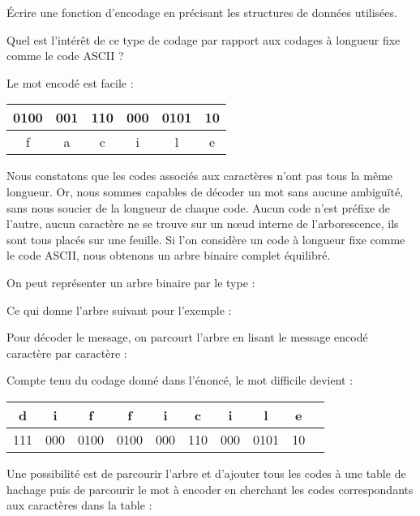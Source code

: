 Écrire une fonction d'encodage en précisant les structures de données utilisées.

\Q
Quel est l'intérêt de ce type de codage par rapport aux codages à longueur fixe comme le code ASCII ?
\newpage

\Corrige

\Q
Le mot encodé est \og facile \fg{} : \begin{tabular}{| c | c | c | c | c | c |}
    \hline
    0100 & 001 & 110 & 000 & 0101 & 10\\
    \hline
    f & a & c & i & l & e\\
    \hline
\end{tabular}
\medskip

Nous constatons que les codes associés aux caractères n'ont pas tous la même longueur. Or, nous sommes capables de décoder un mot sans aucune ambiguïté, sans nous soucier de la longueur de chaque code. Aucun code n'est préfixe de l'autre, aucun caractère ne se trouve sur un nœud interne de l'arborescence, ils sont tous placés sur une feuille. Si l'on considère un code à longueur fixe comme le code ASCII, nous obtenons un arbre binaire complet équilibré.

\Q
On peut représenter un arbre binaire par le type :



Ce qui donne l'arbre suivant pour l'exemple :



Pour décoder le message, on parcourt l'arbre en lisant le message encodé caractère par caractère :



\Q
Compte tenu du codage donné dans l'énoncé, le mot \og difficile \fg{} devient :
\medskip

\begin{tabular}{| c | c | c | c | c | c | c | c | c | c |}
    \hline
    d & i & f & f & i & c & i & l & e\\
    \hline
    111 & 000 & 0100 & 0100 & 000 & 110 & 000 & 0101 & 10\\
    \hline
\end{tabular}
\medskip

Une possibilité est de parcourir l'arbre et d'ajouter tous les codes à une table de hachage puis de parcourir le mot à encoder en cherchant les codes correspondants aux caractères dans la table :

